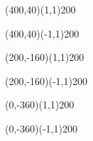 \documentclass[12pt]{article}
\begin{document}
\begin{itemize}
\begin{figure}[htb]
\begin{egame}
\putbranch(400,40)(1,1){200}

\renewcommand{\egarrowstyle}{}

\putbranch(400,40)(-1,1){200}


\renewcommand{\egarrowstyle}{}

\putbranch(200,-160)(1,1){200}

\renewcommand{\egarrowstyle}{}

\putbranch(200,-160)(-1,1){200}

%



\renewcommand{\egarrowstyle}{}

\putbranch(0,-360)(1,1){200}

\renewcommand{\egarrowstyle}{}

\putbranch(0,-360)(-1,1){200}


\end{egame}
\end{figure}
\end{itemize}
\end{document}
